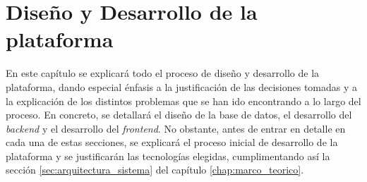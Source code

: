 \chapter{Diseño y Desarrollo de la plataforma}
\label{chap:diseno_desarrollo}

En este capítulo se explicará todo el proceso de diseño y desarrollo de la plataforma, dando especial énfasis a la justificación de las decisiones tomadas y a la explicación de los distintos problemas que se han ido encontrando a lo largo del proceso. En concreto, se detallará el diseño de la base de datos, el desarrollo del \textit{backend} y el desarrollo del \textit{frontend}. No obstante, antes de entrar en detalle en cada una de estas secciones, se explicará el proceso inicial de desarrollo de la plataforma y se justificarán las tecnologías elegidas, cumplimentando así la sección \ref{sec:arquitectura_sistema} del capítulo \ref{chap:marco_teorico}.







